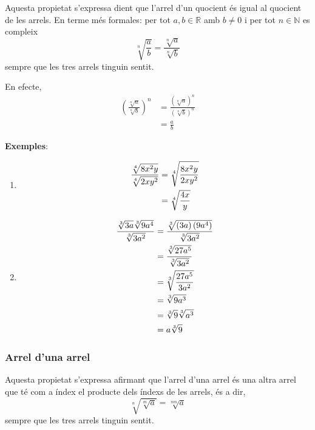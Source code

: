 Aquesta propietat s’expressa dient que l’arrel d’un quocient és igual
al quocient de les arrels. En terme més formales: per tot $%
a,b\in \mathbb{R}$ amb $b\neq 0$ i per tot $n\in \mathbb{N}$ es compleix%
\begin{equation*}
\sqrt[n]{\frac{a}{b}}=\frac{\sqrt[n]{a}}{\sqrt[n]{b}}
\end{equation*}%
sempre que les tres arrels tinguin sentit.

En efecte,%
\begin{align*}
\left( \frac{\sqrt[n]{a}}{\sqrt[n]{b}}\right) ^{n} &=\frac{\left( \sqrt[n]{a%
}\right) ^{n}}{\left( \sqrt[n]{b}\right) ^{n}} \\
&=\frac{a}{b}
\end{align*}

\textbf{Exemples}:

\begin{enumerate}
\item 
\begin{align*}
\frac{\sqrt[4]{8x^{2}y}}{\sqrt[4]{2xy^{2}}} &=\sqrt[4]{\frac{8x^{2}y}{%
2xy^{2}}} \\
&=\sqrt[4]{\frac{4x}{y}}
\end{align*}

\item 
\begin{align*}
\frac{\sqrt[3]{3a}\sqrt[3]{9a^{4}}}{\sqrt[3]{3a^{2}}} &=\frac{\sqrt[3]{%
\left( 3a\right) \left( 9a^{4}\right) }}{\sqrt[3]{3a^{2}}} \\
&=\frac{\sqrt[3]{27a^{5}}}{\sqrt[3]{3a^{2}}} \\
&=\sqrt[3]{\frac{27a^{5}}{3a^{2}}} \\
&=\sqrt[3]{9a^{3}} \\
&=\sqrt[3]{9}\sqrt[3]{a^{3}} \\
&=a\sqrt[3]{9}
\end{align*}
\end{enumerate}

\subsubsection{Arrel d’una arrel}

Aquesta propietat s’expressa afirmant que l’arrel d’una arrel és
una altra arrel que té com a índex el producte dels índexs de
les arrels, és a dir, 
\begin{equation*}
\sqrt[n]{\sqrt[m]{a}}=\sqrt[nm]{a}
\end{equation*}%
sempre que les tres arrels tinguin sentit.

